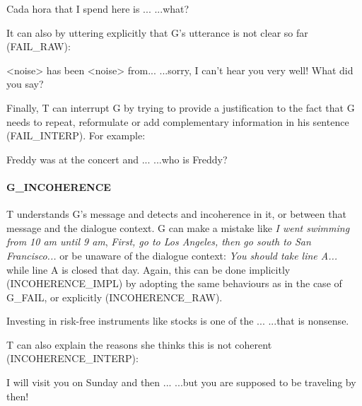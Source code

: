 					\begin{dialogue}
						 Cada hora that I spend here is ...
						 ...what?
					\end{dialogue}
					
					It can also by uttering explicitly that G's utterance is not clear so far (FAIL\_RAW):
					
					\begin{dialogue}
						 <noise> has been <noise> from...
						 ...sorry, I can't hear you very well! What did you say?
					\end{dialogue}
					
					Finally, T can interrupt G by trying to provide a justification to the fact that G needs to repeat, reformulate or add complementary information in his sentence (FAIL\_INTERP). For example:
					
					\begin{dialogue}
						 Freddy was at the concert and ...
						 ...who is Freddy?
					\end{dialogue}
					
				\paragraph{G\_INCOHERENCE} T understands G's message and detects and incoherence in it, or between that message and the dialogue context. G can make a mistake like \textit{I went swimming from 10 am until 9 am}, \textit{First, go to Los Angeles, then go south to San Francisco...} or be unaware of the dialogue context: \textit{You should take line A...} while line A is closed that day. Again, this can be done implicitly (INCOHERENCE\_IMPL) by adopting the same behaviours as in the case of G\_FAIL, or explicitly (INCOHERENCE\_RAW).
					
						\begin{dialogue}
							 Investing in risk-free instruments like stocks is one of the ...
							 ...that is nonsense.
						\end{dialogue}
						
						T can also explain the reasons she thinks this is not coherent (INCOHERENCE\_INTERP):
						
						\begin{dialogue}
							 I will visit you on Sunday and then ...
							 ...but you are supposed to be traveling by then!
						\end{dialogue}
						
